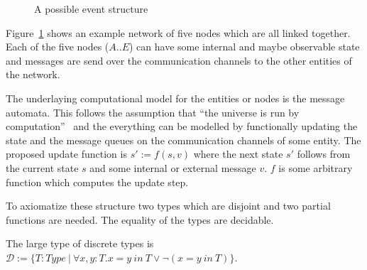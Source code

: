 \begin{figure}[ht]
  \centering
  \caption{A possible event structure}
  \label{fig:structure}
\end{figure}

Figure~\ref{fig:structure} shows an example network of five nodes which
are all linked together. Each of the five nodes ($A..E$) can have some internal
and maybe observable state and messages are send over the communication channels
to the other entities of the network. 

The underlaying computational model for the entities or nodes is the
message automata. This follows the assumption that ``the universe is run by
computation''~\cite{bickford2005causal} and the everything can be modelled
by functionally updating the state and the message queues on the communication
channels of some entity. The proposed update function is $s':=f(s,v)$ where
the next state $s'$ follows from the current state $s$ and some internal or
external message $v$. $f$ is some arbitrary function which computes
the update step.~\cite{bickford2005causal}

To axiomatize these structure two types which are disjoint and two partial
functions are needed. The equality of the types are decidable.

\begin{defi}
  The large type of discrete types is
  $\mathcal{D}:=\{T:Type\ |\ \forall x,y:T.x=y\ in\ T\vee\neg (x=y\ in\ T)\}$.
  \textnormal{~\cite{bickford2005causal}}
\end{defi}


